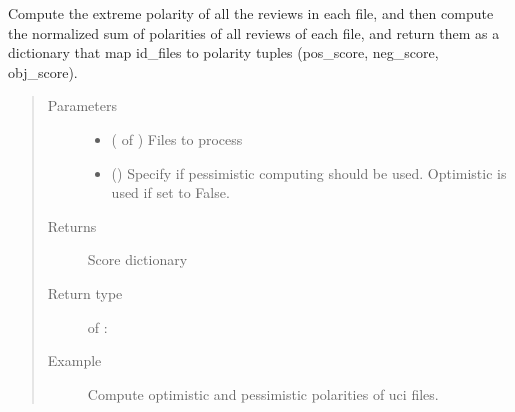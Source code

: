 \documentclass[letterpaper,10pt,english]{sphinxmanual}
\begin{document}
\begin{fulllineitems}
\label{\detokenize{analysis:loacore.analysis.sentiment_analysis.compute_extreme_files_polarity}}
Compute the extreme polarity of all the reviews in each file, and then compute the normalized sum of polarities of
all reviews of each file, and return them as a dictionary that map id\_files to polarity tuples (pos\_score,
neg\_score, obj\_score).
\begin{quote}\begin{description}
\item[{Parameters}] \leavevmode\begin{itemize}
\item {} 
 ( of {\hyperref[\detokenize{classes:loacore.classes.classes.File}]{}}) \textendash{} Files to process

\item {} 
 () \textendash{} Specify if pessimistic computing should be used. Optimistic is used if set to False.

\end{itemize}

\item[{Returns}] \leavevmode
Score dictionary

\item[{Return type}] \leavevmode
{} of  : 

\item[{Example}] \leavevmode
Compute optimistic and pessimistic polarities of uci files.


\end{description}
\end{quote}
\end{fulllineitems}
\end{document}
